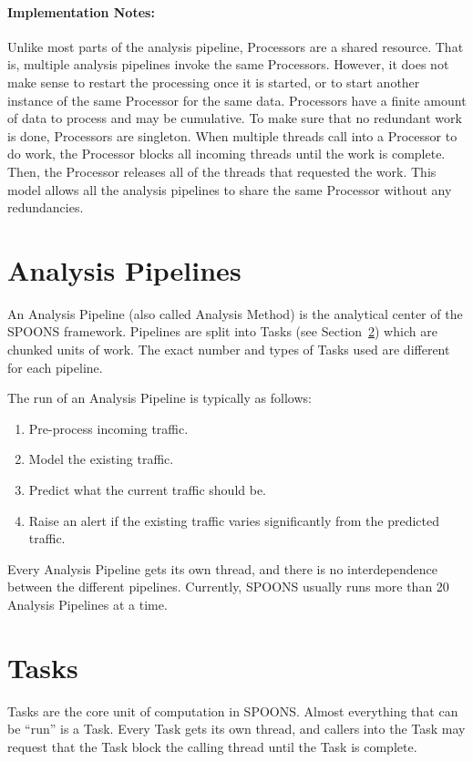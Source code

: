 \documentclass[12pt]{ucthesis}
\begin{document}
\paragraph{Implementation Notes:}
Unlike most parts of the analysis pipeline, Processors are a shared resource. That is, multiple analysis pipelines
invoke the same Processors. However, it does not make sense to restart the processing once it is started, or to
start another instance of the same Processor for the same data. Processors have a finite amount of data to process and may be cumulative.
To make sure that no redundant work is done, Processors are singleton. When multiple threads call into a Processor to do work, the Processor blocks
all incoming threads until the work is complete. Then, the Processor releases all of the threads that requested the work.
This model allows all the analysis pipelines to share the same Processor without any redundancies.

\section{Analysis Pipelines}
\label{arch-pipelines}
An Analysis Pipeline (also called Analysis Method) is the analytical center of the SPOONS framework.
Pipelines are split into Tasks (see Section~\ref{arch-tasks}) which are chunked units of work.
The exact number and types of Tasks used are different for each pipeline.

The run of an Analysis Pipeline is typically as follows:
\begin{enumerate}
   \item Pre-process incoming traffic.
   \item Model the existing traffic.
   \item Predict what the current traffic should be.
   \item Raise an alert if the existing traffic varies significantly from the predicted traffic.
\end{enumerate}

Every Analysis Pipeline gets its own thread, and there is no interdependence between the different pipelines.
Currently, SPOONS usually runs more than 20 Analysis Pipelines at a time.

\section{Tasks}
\label{arch-tasks}
Tasks are the core unit of computation in SPOONS. Almost everything that can be ``run'' is a Task.
Every Task gets its own thread, and callers into the Task may request that the Task block the calling thread
until the Task is complete.
\end{document}
